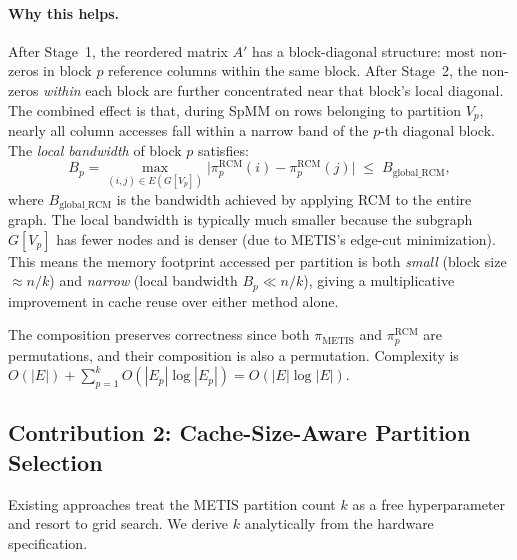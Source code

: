 \documentclass[sigconf,review]{acmart}
\begin{document}
\paragraph{Why this helps.} After Stage~1, the reordered matrix $A'$ has a block-diagonal structure: most non-zeros in block $p$ reference columns within the same block. After Stage~2, the non-zeros \emph{within} each block are further concentrated near that block's local diagonal. The combined effect is that, during SpMM on rows belonging to partition $V_p$, nearly all column accesses fall within a narrow band of the $p$-th diagonal block. The \emph{local bandwidth} of block $p$ satisfies:
\begin{equation}\label{eq:local_bw}
    B_p = \max_{(i,j)\in E(G[V_p])} \bigl|\pi_p^{\text{RCM}}(i) - \pi_p^{\text{RCM}}(j)\bigr| \;\le\; B_{\text{global\_RCM}},
\end{equation}
where $B_{\text{global\_RCM}}$ is the bandwidth achieved by applying RCM to the entire graph. The local bandwidth is typically much smaller because the subgraph $G[V_p]$ has fewer nodes and is denser (due to METIS's edge-cut minimization). This means the memory footprint accessed per partition is both \emph{small} (block size $\approx n/k$) and \emph{narrow} (local bandwidth $B_p \ll n/k$), giving a multiplicative improvement in cache reuse over either method alone.

The composition preserves correctness since both $\pi_{\text{METIS}}$ and $\pi_p^{\text{RCM}}$ are permutations, and their composition is also a permutation. Complexity is $O(|E|) + \sum_{p=1}^{k} O(|E_p| \log |E_p|) = O(|E| \log |E|)$.

\subsection{Contribution 2: Cache-Size-Aware Partition Selection}
\label{sec:cache_aware}

Existing approaches treat the METIS partition count $k$ as a free hyperparameter and resort to grid search. We derive $k$ analytically from the hardware specification.
\end{document}

